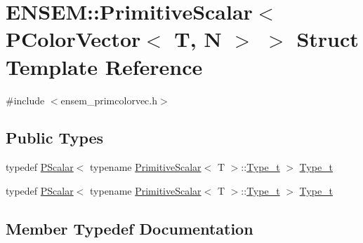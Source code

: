 \hypertarget{structENSEM_1_1PrimitiveScalar_3_01PColorVector_3_01T_00_01N_01_4_01_4}{}\section{E\+N\+S\+EM\+:\+:Primitive\+Scalar$<$ P\+Color\+Vector$<$ T, N $>$ $>$ Struct Template Reference}
\label{structENSEM_1_1PrimitiveScalar_3_01PColorVector_3_01T_00_01N_01_4_01_4}


{\ttfamily \#include $<$ensem\+\_\+primcolorvec.\+h$>$}

\subsection*{Public Types}
\begin{DoxyCompactItemize}
\item 
typedef \mbox{\hyperlink{classENSEM_1_1PScalar}{P\+Scalar}}$<$ typename \mbox{\hyperlink{structENSEM_1_1PrimitiveScalar}{Primitive\+Scalar}}$<$ T $>$\+::\mbox{\hyperlink{structENSEM_1_1PrimitiveScalar_3_01PColorVector_3_01T_00_01N_01_4_01_4_accc4860e90963b3b1cf8d72a9a4a7163}{Type\+\_\+t}} $>$ \mbox{\hyperlink{structENSEM_1_1PrimitiveScalar_3_01PColorVector_3_01T_00_01N_01_4_01_4_accc4860e90963b3b1cf8d72a9a4a7163}{Type\+\_\+t}}
\item 
typedef \mbox{\hyperlink{classENSEM_1_1PScalar}{P\+Scalar}}$<$ typename \mbox{\hyperlink{structENSEM_1_1PrimitiveScalar}{Primitive\+Scalar}}$<$ T $>$\+::\mbox{\hyperlink{structENSEM_1_1PrimitiveScalar_3_01PColorVector_3_01T_00_01N_01_4_01_4_accc4860e90963b3b1cf8d72a9a4a7163}{Type\+\_\+t}} $>$ \mbox{\hyperlink{structENSEM_1_1PrimitiveScalar_3_01PColorVector_3_01T_00_01N_01_4_01_4_accc4860e90963b3b1cf8d72a9a4a7163}{Type\+\_\+t}}
\end{DoxyCompactItemize}


\subsection{Member Typedef Documentation}
\mbox{\label{structENSEM_1_1PrimitiveScalar_3_01PColorVector_3_01T_00_01N_01_4_01_4_accc4860e90963b3b1cf8d72a9a4a7163}} 
